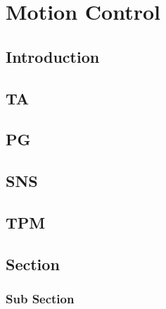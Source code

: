 

\pagestyle{fancy} 
\chapter{Motion Control}
\label{cha:4}
\vspace{1cm}

\section{Introduction}



\section{TA}
\label{sec:1}

\section{PG}
\label{sec:2}

\section{SNS}
\label{sec:3}

\section{TPM}
\label{sec:4}

\section{Section}
\label{sec:5}





\subsection*{Sub Section}

















\clearpage{\pagestyle{empty}\cleardoublepage}